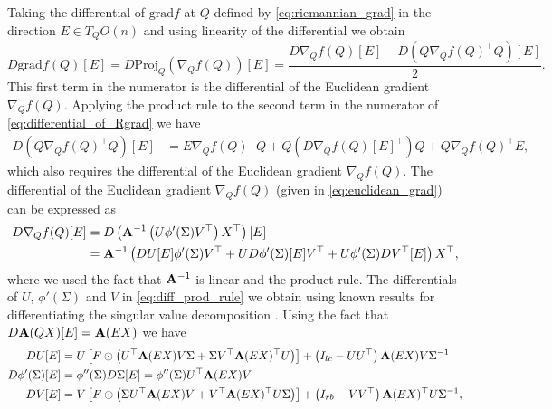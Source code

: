 \documentclass[pdflatex,sn-mathphys-num]{sn-jnl}
\newcommand{\bfA}[1]{{\textbf A}(#1)}
\begin{document}
Taking the differential of $\textrm{grad}f$ at $Q$ defined by \eqref{eq:riemannian_grad} in the direction $E \in T_Q O(n)$ and using linearity of the differential we obtain 
\begin{equation} \label{eq:differential_of_Rgrad}
D\textrm{grad}f(Q)[E] = D \textrm{Proj}_Q(\nabla_Q f(Q)) [E] = \frac{ D \nabla_Q f(Q)[E] - D\left(Q\nabla_Qf(Q)^{\top}Q\right)[E]}{2}. 
\end{equation}
This first term in the numerator is the differential of the Euclidean gradient $\nabla_Qf(Q)$. Applying the product rule to the second term in the numerator of \eqref{eq:differential_of_Rgrad} we have
\begin{align} 
D\left(Q \nabla_Q f(Q)^{\top} Q\right)[E] &= E \nabla_Q f(Q)^{\top} Q + Q \left(D\nabla_Qf(Q)[E]^{\top}\right) Q + Q \nabla_Q f(Q)^{\top} E, 
\end{align}
which also requires the differential of the Euclidean gradient $\nabla_Qf(Q)$. The differential of the Euclidean gradient $\nabla_Qf(Q)$ (given in \eqref{eq:euclidean_grad}) can be expressed as 
\begin{equation} \label{eq:diff_prod_rule}
\begin{aligned}
D \nabla_Q f(Q) [E] &= D \left({\bf A}^{-1}\left(U \phi'(\Sigma) V^{\top}\right)X^{\top}\right)[E] \\
&= {\bf A}^{-1}\left(D U[E] \phi'(\Sigma) V^{\top} +  U D\phi'(\Sigma)[E]V^{\top} + U\phi'(\Sigma)DV^{\top}[E]\right)X^{\top},
\end{aligned}
\end{equation}
where we used the fact that ${\bf A}^{-1}$ is linear and the product rule. The differentials of $U$, $\phi'(\Sigma)$ and $V$ in \eqref{eq:diff_prod_rule} we obtain using known results for differentiating the singular value decomposition \cite{townsend}. Using the fact that $D\bfA{QX}[E]=\bfA{EX}$ we have 
\begin{equation} \label{eq:svd_diff}
\begin{aligned}
DU[E] &= U\left[F \odot \left(U^{\top} \bfA{EX} V\Sigma + \Sigma V^{\top} \bfA{EX}^{\top} U\right)\right] + \left(I_{lc} - UU^{\top}\right)\bfA{EX} V \Sigma^{-1} \\ 
D\phi'(\Sigma)[E] &= \phi''(\Sigma)  D\Sigma [E] = \phi''(\Sigma) U^{\top} \bfA{EX}V \\ 
DV[E] &= V\left[F \odot \left(\Sigma U^{\top} \bfA{EX}V + V^{\top}\bfA{EX}^{\top} U\Sigma\right) \right] + \left(I_{rb} - VV^{\top}\right) \bfA{EX}^{\top} U\Sigma^{-1}, \\ 
\end{aligned}
\end{equation} 
\end{document}
